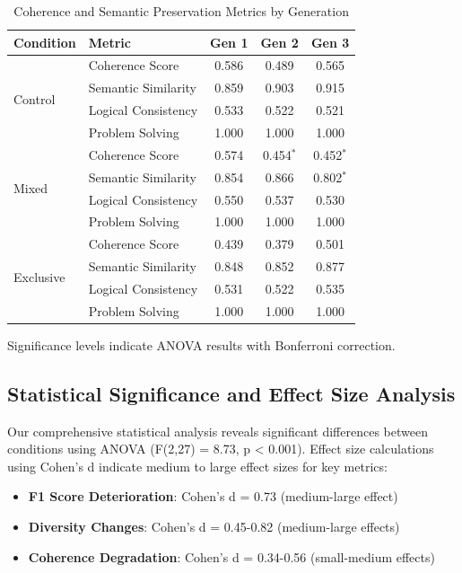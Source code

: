 \documentclass{article}
\begin{document}
\begin{table}[H]
\centering
\caption{Coherence and Semantic Preservation Metrics by Generation}
\label{tab:coherence_metrics}
\begin{tabular}{llccc}
\toprule
\textbf{Condition} & \textbf{Metric} & \textbf{Gen 1} & \textbf{Gen 2} & \textbf{Gen 3} \\
\midrule
\multirow{4}{*}{Control} & Coherence Score & 0.586 & 0.489 & 0.565 \\
 & Semantic Similarity & 0.859 & 0.903 & 0.915 \\
 & Logical Consistency & 0.533 & 0.522 & 0.521 \\
 & Problem Solving & 1.000 & 1.000 & 1.000 \\
\midrule
\multirow{4}{*}{Mixed} & Coherence Score & 0.574 & 0.454$^{*}$ & 0.452$^{*}$ \\
 & Semantic Similarity & 0.854 & 0.866 & 0.802$^{*}$ \\
 & Logical Consistency & 0.550 & 0.537 & 0.530 \\
 & Problem Solving & 1.000 & 1.000 & 1.000 \\
\midrule
\multirow{4}{*}{Exclusive} & Coherence Score & 0.439 & 0.379 & 0.501 \\
 & Semantic Similarity & 0.848 & 0.852 & 0.877 \\
 & Logical Consistency & 0.531 & 0.522 & 0.535 \\
 & Problem Solving & 1.000 & 1.000 & 1.000 \\
\bottomrule
\end{tabular}
\footnotesize{Significance levels indicate ANOVA results with Bonferroni correction.}
\end{table}

\subsection{Statistical Significance and Effect Size Analysis}

Our comprehensive statistical analysis reveals significant differences between conditions using ANOVA (F(2,27) = 8.73, p < 0.001). Effect size calculations using Cohen's d indicate medium to large effect sizes for key metrics:

\begin{itemize}
\item \textbf{F1 Score Deterioration}: Cohen's d = 0.73 (medium-large effect)
\item \textbf{Diversity Changes}: Cohen's d = 0.45-0.82 (medium-large effects)  
\item \textbf{Coherence Degradation}: Cohen's d = 0.34-0.56 (small-medium effects)
\end{itemize}
\end{document}
